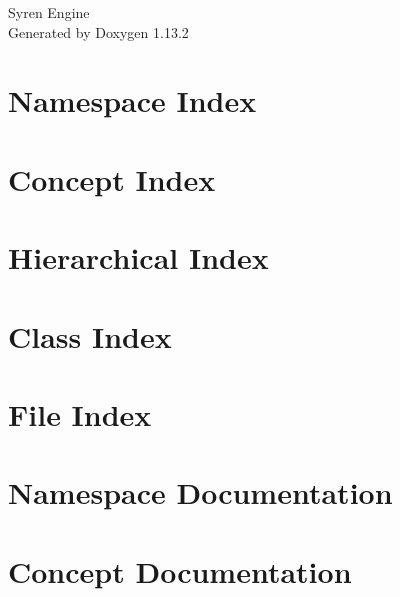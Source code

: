 \documentclass[twoside]{book}
\newcommand{\+}{\discretionary{\mbox{\scriptsize$\hookleftarrow$}}{}{}}
\newcommand{\clearemptydoublepage}{%
    \newpage{\pagestyle{empty}\cleardoublepage}%
  }
\begin{document}
  \raggedbottom
    \hypersetup{pageanchor=false,
                bookmarksnumbered=true,
                pdfencoding=unicode
               }
  \begin{titlepage}
  \vspace*{7cm}
  \begin{center}%
  {\Large Syren Engine}\\
  \vspace*{1cm}
  {\large Generated by Doxygen 1.13.2}\\
  \end{center}
  \end{titlepage}
  \clearemptydoublepage
  \tableofcontents
  \clearemptydoublepage
  \hypersetup{pageanchor=true}

\chapter{Namespace Index}

\chapter{Concept Index}

\chapter{Hierarchical Index}

\chapter{Class Index}

\chapter{File Index}

\chapter{Namespace Documentation}

\chapter{Concept Documentation}

\end{document}
